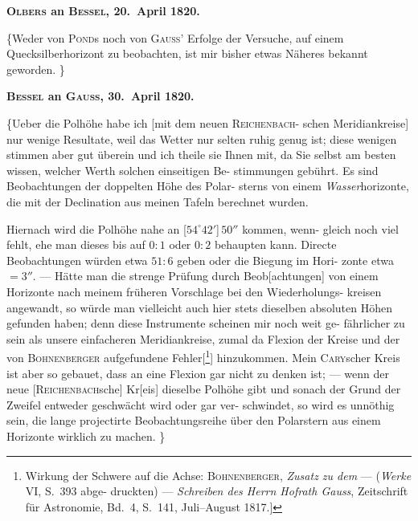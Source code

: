 \documentclass[12pt,a4paper]{article}
\theoremstyle{plain}
\theoremstyle{definition}
\theoremstyle{remark}
\begin{document}
\medskip
\begin{center}
\textbf{\textsc{Olbers} an \textsc{Bessel}, 20.\ April 1820.}
\end{center}

\medskip
\{\dotfill Weder von \textsc{Pond}s noch von \textsc{Gauss}' Erfolge der Versuche,
auf einem Quecksilberhorizont zu beobachten, ist mir bisher etwas N\"{a}heres
bekannt geworden. \dotfill\}

\medskip
\begin{center}
\textbf{\textsc{Bessel} an \textsc{Gauss}, 30.\ April 1820.}
\end{center}

\medskip
\{\dotfill Ueber die Polh\"{o}he habe ich [mit dem neuen \textsc{Reichenbach}-
schen Meridiankreise] nur wenige Resultate, weil das Wetter nur selten ruhig
genug ist; diese wenigen stimmen aber gut \"{u}berein und ich theile sie Ihnen
mit, da Sie selbst am besten wissen, welcher Werth solchen einseitigen Be-
stimmungen geb\"{u}hrt. Es sind Beobachtungen der doppelten H\"{o}he des Polar-
sterns von einem \textit{Wasser}horizonte, die mit der Declination aus meinen Tafeln
berechnet wurden. \dotfill

\dotfill Hiernach wird die Polh\"{o}he nahe an [$54^\circ 42'$]\,$50''$ kommen, wenn-
gleich noch viel fehlt, ehe man dieses bis auf $0\!\!:\!\!1$ oder $0\!\!:\!\!2$ behaupten kann.
Directe Beobachtungen w\"{u}rden etwa $51\!\!:\!\!6$ geben oder die Biegung im Hori-
zonte etwa $= 3''$. --- H\"{a}tte man die strenge Pr\"{u}fung durch Beob[achtungen] von
einem Horizonte nach meinem fr\"{u}heren Vorschlage bei den Wiederholungs-
kreisen angewandt, so w\"{u}rde man vielleicht auch hier stets dieselben absoluten
H\"{o}hen gefunden haben; denn diese Instrumente scheinen mir noch weit ge-
f\"{a}hrlicher zu sein als unsere einfacheren Meridiankreise, zumal da Flexion
der Kreise und der von \textsc{Bohnenberger} aufgefundene Fehler[\footnote{Wirkung der Schwere auf die Achse: \textsc{Bohnenberger}, \textit{Zusatz zu dem} --- (\textit{Werke} VI, S.\ 393 abge-
druckten) --- \textit{Schreiben des Herrn Hofrath Gauss}, Zeitschrift f\"{u}r Astronomie, Bd.\ 4, S.\ 141, Juli--August 1817.]}] hinzukommen.
Mein \textsc{Cary}scher Kreis ist aber so gebauet, dass an eine Flexion gar nicht zu
denken ist; --- wenn der neue [\textsc{Reichenbach}sche] Kr[eis] dieselbe Polh\"{o}he gibt
und sonach der Grund der Zweifel entweder geschw\"{a}cht wird oder gar ver-
schwindet, so wird es unn\"{o}thig sein, die lange projectirte Beobachtungsreihe
\"{u}ber den Polarstern aus einem Horizonte wirklich zu machen. \dotfill\}
\end{document}
